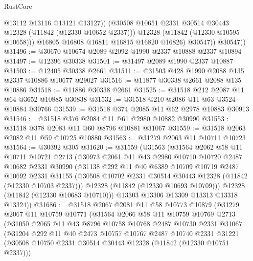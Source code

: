 \begin{lexlean}{RustCore}
\begin{coremodule}
                    @13112
                    @13116
                    @13121
                    @13127))
                (@30508 @10651 @2331 @30514 @30443 @12328 (@11842 (@12330 @10652 @2337)))
                @12328
                (@11842 (@12330 @10595 @10658)))
              @16805
              @16808
              @16811
              @16815
              @16820
              @16826)
            @30547))
        @30547))
@31496 := @30670 @10674 @2089 @2092 @1990 @2337 @10888 @2337 @10894
@31497 := @12396 @30338
@31501 := @31497 @2089 @1990 @2337 @10887
@31503 := @12405 @30338 @2661
@31511 := @31503 @428 @1990 @2088 @135 @2337 @10886 @10677 @29027
@31516 := @11877 @30338 @2661 @2088 @135 @10886
@31518 := @11886 @30338 @2661
@31525 := @31518 @212 @2087 @11 @64 @3652 @10885 @30838
@31532 := @31518 @210 @2086 @11 @63 @3524 @10884 @30766
@31539 := @31518 @374 @2085 @11 @62 @2978 @10883 @30913
@31546 := @31518 @376 @2084 @11 @61 @2980 @10882 @30990
@31553 := @31518 @378 @2083 @11 @60 @8796 @10881 @31067
@31559 := @31518 @2063 @2082 @11 @59 @10725 @10880
@31563 := @31279 @2063 @11 @10711 @10723
@31564 := @30392 @305
@31620 := @31559
    (@31563
      (@31564
        @2062
        @58
        @11
        @10711
        @10721
        @2713
        (@30973
          @2061
          @11
          @43
          @2980
          @10710
          @10720
          @2487
          @10682
          @2331
          @30990
          (@31138
            @292
            @11
            @40
            @6389
            @10709
            @10719
            @2487
            @10692
            @2331
            @31155
            (@30508 @10702 @2331 @30514 @30443 @12328 (@11842 (@12330 @10703 @2337)))
            @12328
            (@11842 (@12330 @10693 @10709)))
          @12328
          (@11842 (@12330 @10683 @10710)))
        @13303
        @13306
        @13309
        @13313
        @13318
        @13324))
@31686 := @31518
    @2067
    @2081
    @11
    @58
    @10773
    @10879
    (@31279
      @2067
      @11
      @10759
      @10771
      (@31564
        @2066
        @58
        @11
        @10759
        @10769
        @2713
        (@31050
          @2065
          @11
          @43
          @8796
          @10758
          @10768
          @2487
          @10730
          @2331
          @31067
          (@31204
            @292
            @11
            @40
            @2473
            @10757
            @10767
            @2487
            @10740
            @2331
            @31221
            (@30508 @10750 @2331 @30514 @30443 @12328 (@11842 (@12330 @10751 @2337)))

\end{coremodule}
\end{lexlean}
